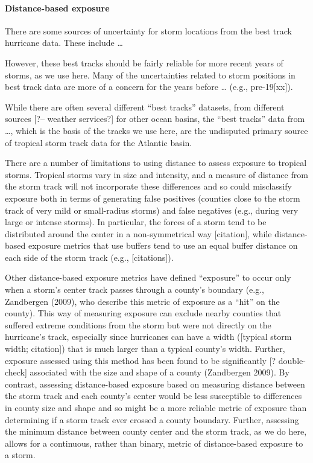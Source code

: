 \documentclass[]{elsarticle} %
\begin{document}
\paragraph{Distance-based exposure}\label{distance-based-exposure-1}

There are some sources of uncertainty for storm locations from the best
track hurricane data. These include \ldots{}

However, these best tracks should be fairly reliable for more recent
years of storms, as we use here. Many of the uncertainties related to
storm positions in best track data are more of a concern for the years
before \ldots{} (e.g., pre-19{[}xx{]}).

While there are often several different ``best tracks'' datasets, from
different sources {[}?-- weather services?{]} for other ocean basins,
the ``best tracks'' data from \ldots{}, which is the basis of the tracks
we use here, are the undisputed primary source of tropical storm track
data for the Atlantic basin.

There are a number of limitations to using distance to assess exposure
to tropical storms. Tropical storms vary in size and intensity, and a
measure of distance from the storm track will not incorporate these
differences and so could misclassify exposure both in terms of
generating false positives (counties close to the storm track of very
mild or small-radius storms) and false negatives (e.g., during very
large or intense storms). In particular, the forces of a storm tend to
be distributed around the center in a non-symmetrical way
{[}citation{]}, while distance-based exposure metrics that use buffers
tend to use an equal buffer distance on each side of the storm track
(e.g., {[}citations{]}).

Other distance-based exposure metrics have defined ``exposure'' to occur
only when a storm's center track passes through a county's boundary
(e.g., Zandbergen (2009), who describe this metric of exposure as a
``hit'' on the county). This way of measuring exposure can exclude
nearby counties that suffered extreme conditions from the storm but were
not directly on the hurricane's track, especially since hurricanes can
have a width ({[}typical storm width; citation{]}) that is much larger
than a typical county's width. Further, exposure assessed using this
method has been found to be significantly {[}? double-check{]}
associated with the size and shape of a county (Zandbergen 2009). By
contrast, assessing distance-based exposure based on measuring distance
between the storm track and each county's center would be less
susceptible to differences in county size and shape and so might be a
more reliable metric of exposure than determining if a storm track ever
crossed a county boundary. Further, assessing the minimum distance
between county center and the storm track, as we do here, allows for a
continuous, rather than binary, metric of distance-based exposure to a
storm.
\end{document}
